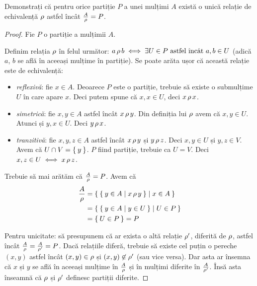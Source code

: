 \begin{exercise}
Demonstrați că pentru orice partiție \(P\) a unei mulțimi \(A\) există o unică relație de echivalență \(\operatorname{\rho}\) astfel încât \(\frac{A}{\operatorname{\rho}} = P\).
\end{exercise}
\begin{proof}
Fie \(P\) o partiție a mulțimii \(A\).

Definim relația \(\operatorname{\rho}\) în felul următor: \(a \operatorname{\rho} b \iff \exists U \in P \text{ astfel încât } a, b \in U\) (adică \(a\), \(b\) se află în aceeași mulțime în partiție). Se poate arăta ușor că această relație este de echivalență:
\begin{itemize}
    \item \emph{reflexivă}: fie \(x \in A\). Deoarece \(P\) este o partiție, trebuie să existe o submulțime \(U\) în care apare \(x\). Deci putem spune că \(x, x \in U\), deci \(x \operatorname{\rho} x\).
    \item \emph{simetrică}: fie \(x, y \in A\) astfel încât \(x \operatorname{\rho} y\). Din definiția lui \(\operatorname{\rho}\) avem că \(x, y \in U\). Atunci și \(y, x \in U\). Deci \(y \operatorname{\rho} x\).
    \item \emph{tranzitivă}: fie \(x, y, z \in A\) astfel încât \(x \operatorname{\rho} y\) și \(y \operatorname{\rho} z\). Deci \(x, y \in U\) și \(y, z \in V\). Avem că \(U \cap V = \Set{y}\). \(P\) fiind partiție, trebuie ca \(U = V\). Deci \(x, z \in U \iff x \operatorname{\rho} z\).
\end{itemize}

Trebuie să mai arătăm că \(\frac{A}{\operatorname{\rho}} = P\). Avem că
\begin{align*}
    \frac{A}{\operatorname{\rho}} &= \Set{ \Set{ y \in A | x \operatorname{\rho}y } | x \in A } \\
    &= \Set{ \Set{ y \in A | y \in U } | U \in P } \\
    &= \Set{ U \in P } = P
\end{align*}

Pentru unicitate: să presupunem că ar exista o altă relație \(\operatorname{\rho}'\), diferită de \(\operatorname{\rho}\), astfel încât \(\frac{A}{\operatorname{\rho}} = \frac{A}{\operatorname{\rho}'} = P\). Dacă relațiile diferă, trebuie să existe cel puțin o pereche \((x, y)\) astfel încât \((x, y) \in \operatorname{\rho}\) și \((x, y) \not\in \operatorname{\rho}'\) (sau vice versa). Dar asta ar însemna că \(x\) și \(y\) se află în aceeași mulțime în \(\frac{A}{\operatorname{\rho}}\) și în mulțimi diferite în \(\frac{A}{\operatorname{\rho}'}\). Însă asta înseamnă că \(\operatorname{\rho}\) și \(\operatorname{\rho}'\) definesc partiții diferite.
\end{proof}

